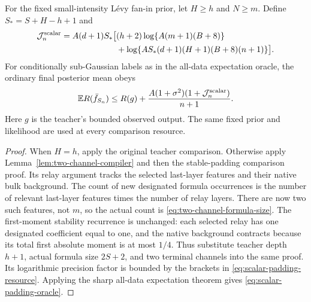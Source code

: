 \begin{corollary}
\label{cor:two-channel-prior-padding}
For the fixed small-intensity L\'evy fan-in prior, let $H\ge h$ and
$N\ge m$. Define $S_*=S+H-h+1$ and
\begin{align}
 \mathcal J^{\mathrm{scalar}}_n
 =A(d+1)S_*\bigl[&(h+2)\log\{A(m+1)(B+8)\}\notag\\
 &+\log\{A S_*(d+1)(H+1)(B+8)(n+1)\}\bigr].
 \label{eq:scalar-padding-resource}
\end{align}
For conditionally sub-Gaussian labels as in the all-data expectation
oracle, the ordinary final posterior mean obeys
\begin{equation}
 \mathbb E R(\bar f_{S_n})
 \le R(g)+\frac{A(1+\sigma^2)(1+\mathcal J^{\mathrm{scalar}}_n)}{n+1}.
 \label{eq:scalar-padding-oracle}
\end{equation}
Here $g$ is the teacher's bounded observed output. The same fixed
prior and likelihood are used at every comparison resource.
\end{corollary}
\begin{proof}
When $H=h$, apply the original teacher comparison.
Otherwise apply Lemma~\ref{lem:two-channel-compiler} and then the
stable-padding comparison proof. Its relay argument tracks the
selected last-layer features and their native bulk background. The
count of new designated formula occurrences is the number of
relevant last-layer features times the number of relay layers.
There are now two such features, not $m$, so the actual count is
\eqref{eq:two-channel-formula-size}. The first-moment stability
recurrence is unchanged: each selected relay has one designated
coefficient equal to one, and the native background contracts because
its total first absolute moment is at most $1/4$.
Thus substitute teacher depth $h+1$, actual formula size $2S+2$,
and two terminal channels into the same proof. Its logarithmic
precision factor is bounded by the brackets in
\eqref{eq:scalar-padding-resource}. Applying the sharp all-data
expectation theorem gives \eqref{eq:scalar-padding-oracle}.
\end{proof}

